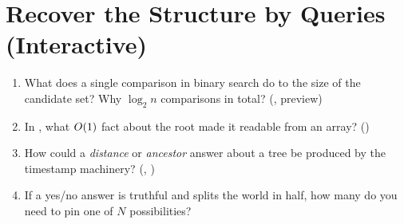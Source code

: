 \section{Recover the Structure by Queries (Interactive)}\label{sec:c25-query}

\begin{previouslybox}
\begin{enumerate}[nosep, leftmargin=1.6em]
  \item What does a single comparison in binary search do to the size of the candidate set? Why
        $\log_2 n$ comparisons in total? (,  preview)
  \item In , what $O(1)$ fact about the root made it readable from an array?
        ()
  \item How could a \emph{distance} or \emph{ancestor} answer about a tree be produced by the
        timestamp machinery? (, )
  \item If a yes/no answer is truthful and splits the world in half, how many do you need to pin
        one of $N$ possibilities?
\end{enumerate}
\end{previouslybox}

